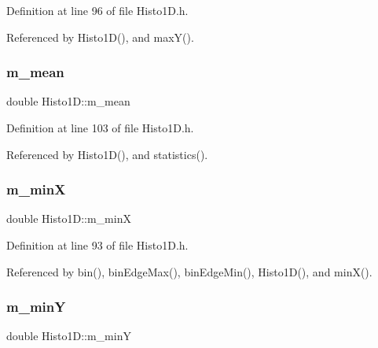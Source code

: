 Definition at line 96 of file Histo1\+D.\+h.



Referenced by Histo1\+D(), and max\+Y().

\mbox{\label{classHisto1D_a7e49893543fb5d2af37167690bc0b0ff}} 
\subsubsection{\texorpdfstring{m\+\_\+mean}{m\_mean}}
{\footnotesize\ttfamily double Histo1\+D\+::m\+\_\+mean\hspace{0.3cm}{\ttfamily [private]}}



Definition at line 103 of file Histo1\+D.\+h.



Referenced by Histo1\+D(), and statistics().

\mbox{\label{classHisto1D_af5ce58b20e96fa6e4b306109dd88589e}} 
\subsubsection{\texorpdfstring{m\+\_\+minX}{m\_minX}}
{\footnotesize\ttfamily double Histo1\+D\+::m\+\_\+minX\hspace{0.3cm}{\ttfamily [private]}}



Definition at line 93 of file Histo1\+D.\+h.



Referenced by bin(), bin\+Edge\+Max(), bin\+Edge\+Min(), Histo1\+D(), and min\+X().

\mbox{\label{classHisto1D_a3bb6c3ea23a1af14ebb10af807f3810d}} 
\subsubsection{\texorpdfstring{m\+\_\+minY}{m\_minY}}
{\footnotesize\ttfamily double Histo1\+D\+::m\+\_\+minY\hspace{0.3cm}{\ttfamily [private]}}



